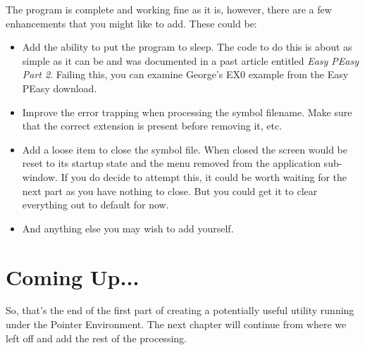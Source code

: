 The program is complete and working fine as it is, however, there
    are a few enhancements that you might like to add. These could be:
\begin{itemize}[itemsep=0pt]

\item{}Add the ability to put the program to sleep. The code to do this
        is about as simple as it can be and was documented in a past article
        entitled \emph{Easy PEasy Part 2}. Failing this, you can
        examine George's EX0 example from the Easy
        PEasy download.


\item{}Improve the error trapping when processing the symbol filename.
        Make sure that the correct extension is present before removing it,
        etc.


\item{}Add a loose item to close the symbol file. When closed the
        screen would be reset to its startup state and the menu removed from
        the application sub-{}window. If you do decide to attempt this, it could
        be worth waiting for the next part as you have nothing to close. But
        you could get it to clear everything out to default for now.


\item{}And anything else you may wish to add yourself.

\end{itemize}

\section{Coming Up...}
\label{ch31-the-end}%

So, that's the end of the first part of creating a potentially
    useful utility running under the Pointer Environment. The next chapter 
    will continue from where we left off and add the rest of the
    processing.
